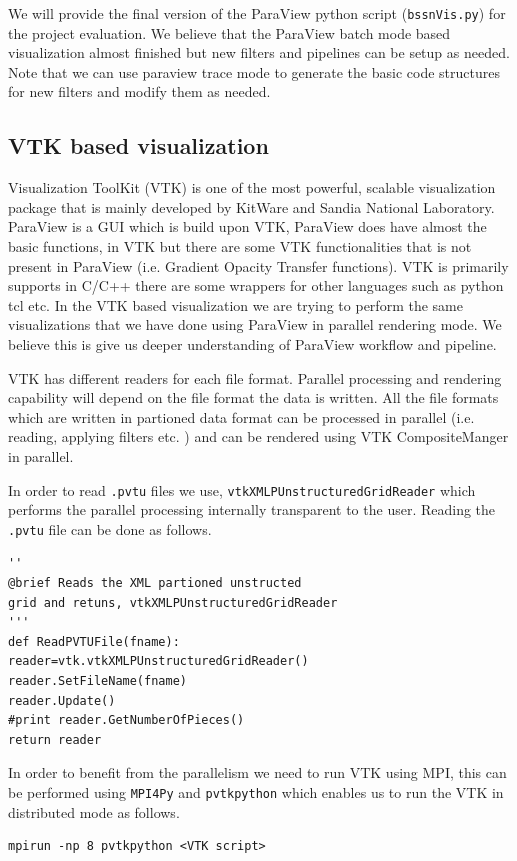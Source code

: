 We will provide the final version of the ParaView python script (\texttt{bssnVis.py}) for the project evaluation. We believe that the ParaView batch mode based visualization almost finished but new filters and pipelines can be setup as needed.
Note that we can use paraview trace mode to generate the basic code structures for new filters and modify them as needed. 

\subsection{VTK based visualization }
Visualization ToolKit (VTK) is one of the most powerful, scalable visualization package that is mainly developed by KitWare and Sandia National Laboratory. ParaView is a GUI which is build upon VTK, ParaView does have almost the basic functions, 
in VTK but there are some VTK functionalities that is not present in ParaView (i.e. Gradient Opacity Transfer functions). VTK is primarily supports in C/C++ there are some wrappers for other languages such as python tcl etc. In the VTK based visualization 
we are trying to perform the same visualizations that we have done using ParaView in parallel rendering mode. We believe this is give us deeper understanding of ParaView workflow and pipeline. 

VTK has different readers for each file format. Parallel processing and rendering capability will depend on the file format the data is written. All the file formats which are written in partioned data format can be processed in parallel (i.e. reading, applying filters etc. )
and can be rendered using VTK CompositeManger in parallel. 

In order to read \texttt{.pvtu} files we use, \texttt{vtkXMLPUnstructuredGridReader} which performs the parallel processing internally transparent to the user. Reading the \texttt{.pvtu} file can be done as follows. 
\begin{lstlisting}[basicstyle=\small]
''
@brief Reads the XML partioned unstructed 
grid and retuns, vtkXMLPUnstructuredGridReader
'''
def ReadPVTUFile(fname):
reader=vtk.vtkXMLPUnstructuredGridReader()
reader.SetFileName(fname)
reader.Update()
#print reader.GetNumberOfPieces()
return reader
\end{lstlisting}

In order to benefit from the parallelism we need to run VTK using MPI, this can be performed using \texttt{MPI4Py} and \texttt{pvtkpython} which enables us to run the VTK in distributed mode as follows.
\begin{lstlisting}[basicstyle=\small]
mpirun -np 8 pvtkpython <VTK script>
\end{lstlisting} 

